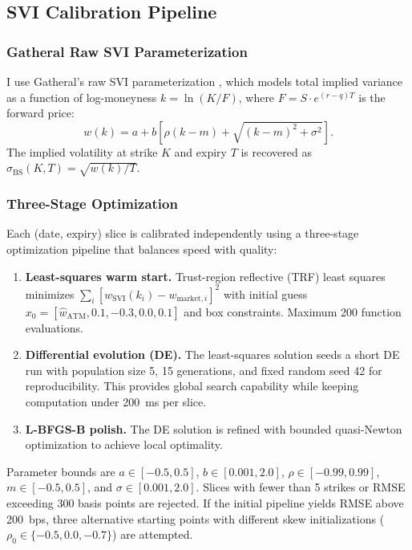\documentclass[12pt, letterpaper]{article}
\begin{document}
\subsection{SVI Calibration Pipeline}
\label{sec:svi_calibration}

\subsubsection{Gatheral Raw SVI Parameterization}

I use Gatheral's raw SVI parameterization \citep{Gatheral2004}, which models total implied variance as a function of log-moneyness $k = \ln(K/F)$, where $F = S \cdot e^{(r-q)T}$ is the forward price:
\begin{equation}
    w(k) = a + b\left[\rho(k - m) + \sqrt{(k - m)^2 + \sigma^2}\right].
    \label{eq:svi_raw}
\end{equation}
The implied volatility at strike $K$ and expiry $T$ is recovered as $\sigma_{\text{BS}}(K, T) = \sqrt{w(k) / T}$.

\subsubsection{Three-Stage Optimization}

Each (date, expiry) slice is calibrated independently using a three-stage optimization pipeline that balances speed with quality:

\begin{enumerate}
    \item \textbf{Least-squares warm start.} Trust-region reflective (TRF) least squares minimizes $\sum_i [w_{\text{SVI}}(k_i) - w_{\text{market},i}]^2$ with initial guess $x_0 = [\hat{w}_{\text{ATM}}, 0.1, -0.3, 0.0, 0.1]$ and box constraints. Maximum 200 function evaluations.

    \item \textbf{Differential evolution (DE).} The least-squares solution seeds a short DE run \citep{Storn1997} with population size 5, 15 generations, and fixed random seed 42 for reproducibility. This provides global search capability while keeping computation under 200~ms per slice.

    \item \textbf{L-BFGS-B polish.} The DE solution is refined with bounded quasi-Newton optimization to achieve local optimality.
\end{enumerate}

Parameter bounds are $a \in [-0.5, 0.5]$, $b \in [0.001, 2.0]$, $\rho \in [-0.99, 0.99]$, $m \in [-0.5, 0.5]$, and $\sigma \in [0.001, 2.0]$. Slices with fewer than 5 strikes or RMSE exceeding 300 basis points are rejected. If the initial pipeline yields RMSE above 200~bps, three alternative starting points with different skew initializations ($\rho_0 \in \{-0.5, 0.0, -0.7\}$) are attempted.
\end{document}
